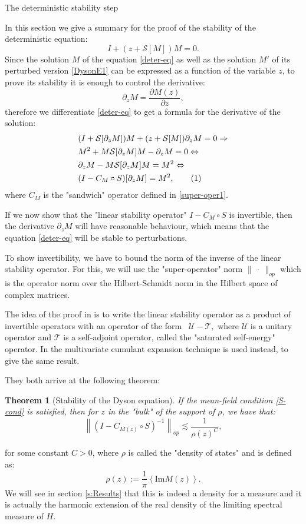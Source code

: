 \documentclass[11pt, a4paper, oneside]{book}
\numberwithin{equation}{chapter}
\newcommand{\beq}{\begin{equation}}
\newcommand{\eeq}{\end{equation}}
\newcommand\numberthis{\addtocounter{equation}{1}\tag{\theequation}}
\newtheorem{thm}{Theorem}[section]
\begin{document}
\begin{section}{The deterministic stability step} \label{s:Stability}

In this section we give a summary for the proof of the stability of the deterministic equation:
%
\beq \label{deter-eq}
I + (z + \mathcal{S}[M])M = 0.
\eeq
%
Since the solution $M$ of the equation \eqref{deter-eq} as well as the solution $M'$ of its perturbed version \eqref{DysonE1} can be expressed as a function of the variable $z$, to prove its stability it is enough to control the derivative:
\[
\partial_z M = \frac{\partial M(z) }{ \partial z} ,
\]
%
therefore we differentiate \eqref{deter-eq} to get a formula for the derivative of the solution:
%
\begin{align*}
    &(I + \mathcal{S}[\partial_z M] ) M + (z + \mathcal{S}[M] ) \partial_z M = 0 \Rightarrow \\
    &M^2 + M \mathcal{S}[\partial_z M] M  - \partial_z M = 0  \Leftrightarrow \\
    &\partial_z M - M\mathcal{S}[\partial_z M] M = M^2 \Leftrightarrow \\
    &( I - C_M \circ S )[\partial_z M] = M^2 , \numberthis
\end{align*}
%
where $C_M$ is the "sandwich" operator defined in \eqref{super-oper1}. 

If we now show that the "linear stability operator" $I - C_M \circ S$ is invertible, then the derivative $\partial_z M$ will have reasonable behaviour, which means that the equation \eqref{deter-eq} will be stable to perturbations.

To show invertibility, we have to bound the norm of the inverse of the linear stability operator. For this, we will use the "super-operator" norm $\| \ \cdot \ \|_{op}$ which is the operator norm over the Hilbert-Schmidt norm in the Hilbert space of complex matrices.

The idea of the proof in \cite{ajanki2019stability} is to write the linear stability operator as a product of invertible operators with an operator of the form \ $\mathcal{U} - \mathcal{T},$ where $\mathcal{U}$ is a unitary operator and $\mathcal{T}$ is a self-adjoint operator, called the "saturated self-energy" operator. In \cite{erdHos2019random} the multivariate cumulant expansion technique is used instead, to give the same result.

They both arrive at the following theorem:
%
\begin{thm}[Stability of the Dyson equation] \label{Dyson-stab}
    If the mean-field condition \eqref{S-cond} is satisfied, then for $z$ in the "bulk" of the support of $\rho$, we have that:
    \[
    \left \| ( I - C_{M(z)} \circ S )^{-1} \right \|_{op} \lesssim \frac{1}{\rho(z)^C},
    \]
\end{thm}
%
for some constant $C>0$, where $\rho$ is called the "density of states" and is defined as:
%
\beq \label{states}
\rho(z) := \frac{1}{\pi} \left \langle \mathrm{Im} M(z) \right \rangle .
\eeq
%
We will see in section \ref{s:Results} that this is indeed a density for a measure and it is actually the harmonic extension of the real density of the limiting spectral measure of $H$.
 

\end{section}
\end{document}
